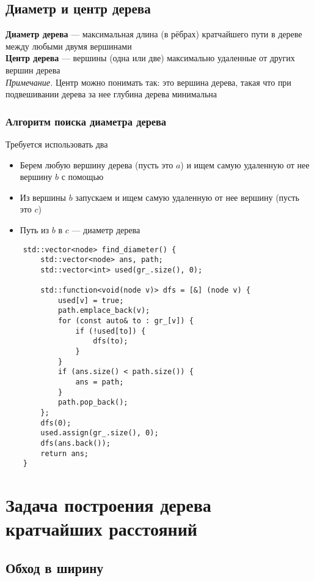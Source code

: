 \documentclass[a4paper]{article}
\begin{document}
\subsection{Диаметр и центр дерева}
\textbf{Диаметр дерева} — максимальная длина (в рёбрах) кратчайшего пути в дереве между любыми двумя вершинами\\[2mm]
\indent\textbf{Центр дерева} — вершины (одна или две) максимально удаленные от других вершин дерева\\
\indent\indent\textit{Примечание.} Центр можно понимать так: это вершина дерева, такая что при подвешивании дерева за нее глубина дерева минимальна
\subsubsection*{Алгоритм поиска диаметра дерева}
Требуется использовать два \dfs
\begin{itemize}
    \item Берем любую вершину дерева (пусть это $a$) и ищем самую удаленную от нее вершину $b$ с помощью \dfs
    \item Из вершины $b$ запускаем \dfs и ищем самую удаленную от нее вершину (пусть это $c$)
    \item Путь из $b$ в $c$ — диаметр дерева
\end{itemize}

\begin{lstlisting}
    std::vector<node> find_diameter() {
        std::vector<node> ans, path;
        std::vector<int> used(gr_.size(), 0);

        std::function<void(node v)> dfs = [&] (node v) {
            used[v] = true;
            path.emplace_back(v);
            for (const auto& to : gr_[v]) {
                if (!used[to]) {
                    dfs(to);
                }
            }
            if (ans.size() < path.size()) {
                ans = path;
            }
            path.pop_back();
        };
        dfs(0);
        used.assign(gr_.size(), 0);
        dfs(ans.back());
        return ans;
    }
\end{lstlisting}

\section{Задача построения дерева кратчайших расстояний}
\subsection{Обход в ширину}
\end{document}

